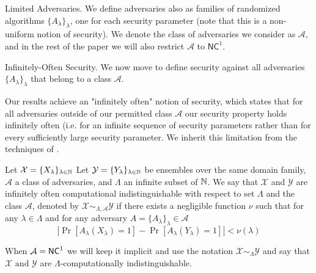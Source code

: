 \medskip
\noindent
{\sc Limited Adversaries.}
We define adversaries also as families of randomized algorithms $\{A_\lambda\}_\lambda$, 
one for each security parameter (note that this is a non-uniform notion of security). We denote
the class of adversaries we consider as $\mathcal{A}$, and in the rest of the
paper we will also restrict $\mathcal{A}$ to $\mathsf{NC}^1$.


\medskip
\noindent
{\sc Infinitely-Often Security.}
We now move to define security against all adversaries $\{A_\lambda\}_\lambda$ that belong to a class $\mathcal{A}$. 


Our results achieve an "infinitely often" notion of security, which states that for all adversaries outside of our permitted class $\mathcal{A}$ our security property holds infinitely often (i.e. for an infinite sequence of security parameters rather than for every sufficiently large security parameter. We 
inherit this limitation from the techniques of \cite{fgcrypto}. 

\begin{definition}
Let $\mathcal{X} = \{X_{\lambda}\}_{\lambda\in\mathbb{N}}$ Let $\mathcal{Y} = \{Y_{\lambda}\}_{\lambda\in\mathbb{N}}$ be ensembles over the same domain family, $\mathcal{A}$ a class of adversaries, and $\Lambda$ an infinite subset of $\mathbb{N}$. 
We say that $\mathcal{X}$ and $\mathcal{Y}$ are infinitely often computational indistinguishable with respect to set $\Lambda$ and the class $\mathcal{A}$,
denoted by
$\mathcal{X} \sim_{\Lambda,\mathcal{A}} \mathcal{Y}$
if there exists a negligible function $\nu$ such that for any $\lambda \in \Lambda$ and for any adversary $A=\{A_\lambda\}_\lambda \in \mathcal{A}$
\[
| \Pr[A_{\lambda}(X_{\lambda}) = 1] - \Pr[A_{\lambda}(Y_{\lambda}) = 1]| < \nu(\lambda)
\]
\end{definition}
When $\mathcal{A} = {\mathsf{NC}}^1$ we will keep it implicit and use the notation $\mathcal{X} \sim_{\Lambda} \mathcal{Y}$ and say that $\mathcal{X} \text{ and } \mathcal{Y}$ are $\Lambda$-computationally indistinguishable.


